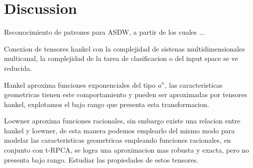 \documentclass[sensors,article,submit,moreauthors,pdftex]{Definitions/mdpi}
\providecommand{\DIFaddbegin}{} %
\providecommand{\DIFaddend}{} %
\providecommand{\DIFdelbegin}{} %
\providecommand{\DIFdelend}{} %
\begin{document}

%

\section{Discussion}
\DIFdelbegin %

\DIFdelend \DIFaddbegin \color{red}
\DIFaddend Reconocimiento de patrones para ASDW, a partir de los cuales ...

Conexion de tensores hankel con la complejidad de sistenas multidimensionales multicanal, la complejidad de la tarea de clasificacion o del input space se ve reducida.

Hankel aproxima funciones exponenciales del tipo $a^n$, las caracteristicas geometricas tienen este comportamiento y pueden ser aproximadas por tensores hankel, explotamos el bajo rango que presenta esta transformacion.

Loewner aproxima funciones racionales, sin embargo existe una relacion entre hankel y loewner, de esta manera podemos emplearlo del mismo modo para modelar las caracteristicas geometricas empleando funciones racionales, en conjunto con t-RPCA, se logra una aproximacion mas robusta y exacta, pero no presenta bajo rango. Estudiar las propiedades de estos tensores.
\DIFdelbegin %

\DIFdelend \DIFaddbegin \color{black}
\DIFaddend %
\end{document}
